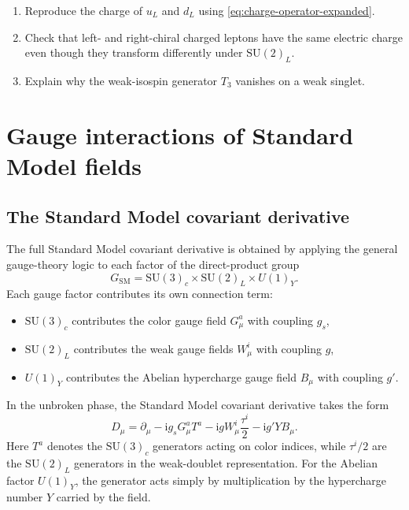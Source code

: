 \documentclass[11pt,a4paper]{article}
\newcommand{\ii}{\mathrm{i}}
\newcommand{\p}{\partial}
\newcommand{\SUc}{\mathrm{SU}(3)_c}
\newcommand{\SUw}{\mathrm{SU}(2)_L}
\begin{document}
\begin{guidedchecksbox}
\vspace{0.25cm}
\begin{enumerate}[leftmargin=1.6em,label=\arabic*.]
    \item Reproduce the charge of \(u_L\) and \(d_L\) using \eqref{eq:charge-operator-expanded}.
    \item Check that left- and right-chiral charged leptons have the same electric charge even though they transform differently under \(\SUw\).
    \item Explain why the weak-isospin generator \(T_3\) vanishes on a weak singlet.
\end{enumerate}
\end{guidedchecksbox}




\section{Gauge interactions of Standard Model fields}

\subsection{The Standard Model covariant derivative}

The full Standard Model covariant derivative is obtained by applying the general gauge-theory logic to each factor of the direct-product group
\[
G_{\text{SM}}=\SUc\times\SUw\times U(1)_Y.
\]
Each gauge factor contributes its own connection term:
\begin{itemize}[leftmargin=1.7em]
	\item \(\SUc\) contributes the color gauge field \(G_\mu^a\) with coupling \(g_s\),
	\item \(\SUw\) contributes the weak gauge fields \(W_\mu^i\) with coupling \(g\),
	\item \(U(1)_Y\) contributes the Abelian hypercharge gauge field \(B_\mu\) with coupling \(g'\).
\end{itemize}

In the unbroken phase, the Standard Model covariant derivative takes the form
\begin{equation}
	D_\mu=
	\p_\mu
	-\ii g_s G_\mu^aT^a
	-\ii gW_\mu^i\frac{\tau^i}{2}
	-\ii g' Y B_\mu.
	\label{eq:sm-covariant-derivative-expanded}
\end{equation}
Here \(T^a\) denotes the \(\SUc\) generators acting on color indices, while \(\tau^i/2\) are the \(\SUw\) generators in the weak-doublet representation. For the Abelian factor \(U(1)_Y\), the generator acts simply by multiplication by the hypercharge number \(Y\) carried by the field.
\end{document}
